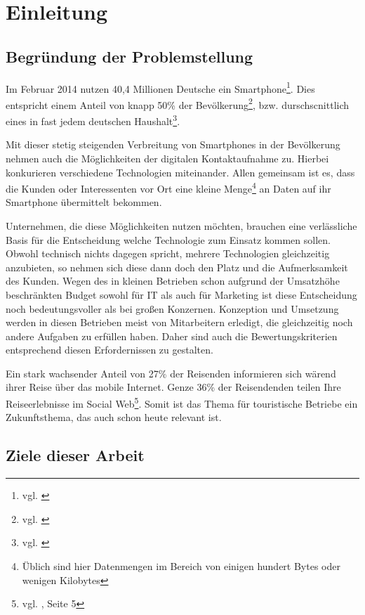 \section{Einleitung}
\label{sec:einleitung}

\subsection{Begründung der Problemstellung}

Im Februar 2014 nutzen 40,4 Millionen Deutsche ein Smartphone\footnote{vgl. \cite{netzoekonom}}. Dies entspricht einem Anteil von knapp 50\% der Bevölkerung\footnote{vgl. \cite{destatis:bev}}, bzw. durschscnittlich eines in fast jedem deutschen Haushalt\footnote{vgl. \cite{destatis:hh}}. 

Mit dieser stetig steigenden Verbreitung von Smartphones in der Bevölkerung nehmen auch die Möglichkeiten der digitalen Kontaktaufnahme zu. 
Hierbei konkurieren verschiedene Technologien miteinander. Allen gemeinsam ist es, dass die Kunden oder Interessenten vor Ort eine kleine Menge\footnote{Üblich sind hier Datenmengen im Bereich von einigen hundert Bytes oder wenigen Kilobytes} an Daten auf ihr Smartphone übermittelt bekommen.

Unternehmen, die diese Möglichkeiten nutzen möchten, brauchen eine verlässliche Basis für die Entscheidung welche Technologie zum Einsatz kommen sollen. Obwohl technisch nichts dagegen spricht, mehrere Technologien gleichzeitig anzubieten, so nehmen sich diese dann doch den Platz und die Aufmerksamkeit des Kunden. Wegen des in kleinen Betrieben schon aufgrund der Umsatzhöhe beschränkten Budget sowohl für IT als auch für Marketing ist diese Entscheidung noch bedeutungsvoller als bei großen Konzernen. Konzeption und Umsetzung werden in diesen Betrieben meist von Mitarbeitern erledigt, die gleichzeitig noch andere Aufgaben zu erfüllen haben. Daher sind auch die Bewertungskriterien entsprechend diesen Erfordernissen zu gestalten.

Ein stark wachsender Anteil von 27\% der Reisenden informieren sich wärend ihrer Reise über das mobile Internet. Genze 36\% der Reisendenden  teilen Ihre Reiseerlebnisse im Social Web\footnote{vgl. \cite{reiseanalyse}, Seite 5}. Somit ist das Thema für touristische Betriebe ein Zukunftsthema, das auch schon heute relevant ist.

\subsection{Ziele dieser Arbeit}

